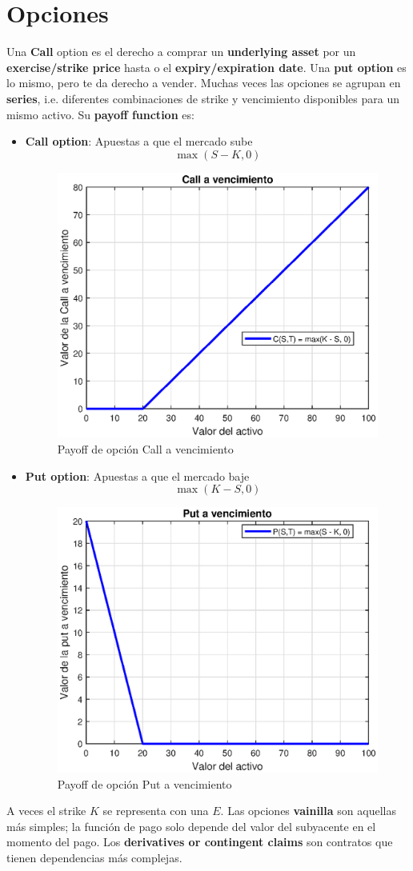 

\section{Opciones}
Una \textbf{Call} option es el derecho a comprar un \textbf{underlying asset} por un \textbf{exercise/strike price} hasta o el \textbf{expiry/expiration date}. Una \textbf{put option} es lo mismo, pero te da derecho a vender. Muchas veces las opciones se agrupan en \textbf{series}, i.e. diferentes combinaciones de strike y vencimiento disponibles para un mismo activo. Su \textbf{payoff function} es:
\begin{itemize}
    \item \textbf{Call option}: Apuestas a que el mercado sube
    $$\max(S-K, 0)$$
    \begin{figure}[H]
        \centering
        \includegraphics[width=0.5\linewidth]{Imagenes/2_Derivados/PayOffCall.eps}
        \caption{Payoff de opción Call a vencimiento}
    \end{figure}
    \item \textbf{Put option}: Apuestas a que el mercado baje
    $$\max(K-S, 0)$$
    \begin{figure}[H]
        \centering
        \includegraphics[width=0.5\linewidth]{Imagenes/2_Derivados/PayOffPut.eps}
        \caption{Payoff de opción Put a vencimiento}
    \end{figure}
\end{itemize}
A veces el strike $K$ se representa con una $E$. Las opciones \textbf{vainilla} son aquellas más simples; la función de pago solo depende del valor del subyacente en el momento del pago. Los \textbf{derivatives or contingent claims} son contratos que tienen dependencias más complejas.


